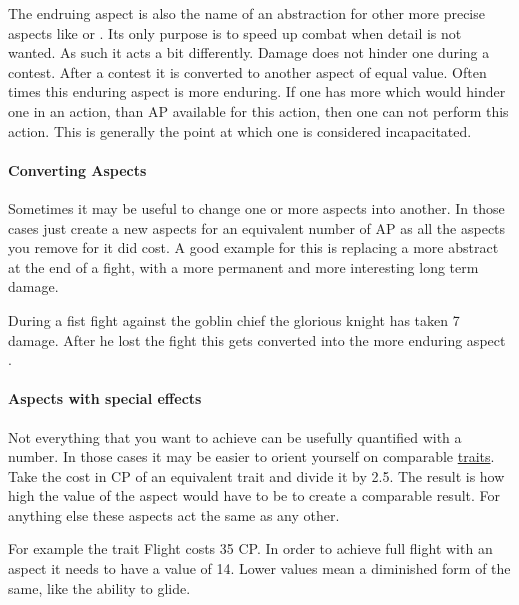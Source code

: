 \documentclass[11pt]{article}
\begin{document}
{The endruing aspect  is also the name of an abstraction for other more precise aspects like  or . Its only purpose is to speed up combat when detail is not wanted. As such it acts a bit differently. Damage does not hinder one during a contest. After a contest it is converted to another aspect of equal value. Often times this enduring aspect is more enduring. If one has more  which would hinder one in an action, than AP available for this action, then one can not perform this action. This is generally the point at which one is considered incapacitated.
\paragraph*{Converting Aspects}
\label{sec:org405c884}

Sometimes it may be useful to change one or more aspects into another. In those cases just create a new aspects for an equivalent number of AP as all the aspects you remove for it did cost.
A good example for this is replacing a more abstract  at the end of a fight, with a more permanent and more interesting long term damage.

\begin{pwexample}
During a fist fight against the goblin chief the glorious knight has taken 7 damage. After he lost the fight this gets converted into the more enduring aspect . 
\end{pwexample}
\paragraph*{Aspects with special effects}
\label{sec:org1edd2e9}

Not everything that you want to achieve can be usefully quantified with a number. In those cases it may be easier to orient yourself on comparable \hyperref[sec:orga3f5999]{traits}. Take the cost in CP of an equivalent trait and divide it by 2.5. The result is how high the value of the aspect would have to be to create a comparable result. For anything else these aspects act the same as any other.

For example the trait Flight costs 35 CP. In order to achieve full flight with an aspect it needs to have a value of 14. Lower values mean a diminished form of the same, like the ability to glide. 
}
\end{document}

